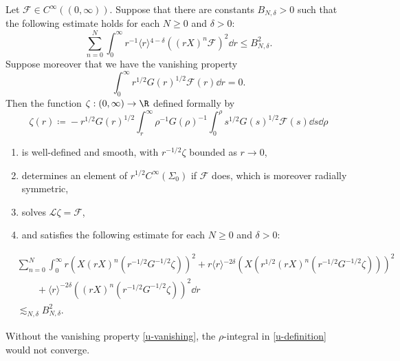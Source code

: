 \documentclass[10pt, reqno]{amsart}
\begin{document}
\begin{proposition}
Let \(\mathcal{F}\in C^\infty((0,\infty))\). Suppose that there are constants \(B_{N,\delta{}} >
0\) such that the following estimate holds for each \(N\ge 0\) and \(\delta{} > 0\):
\begin{equation}\label{F-estimate}
\sum_{n=0}^N\int_0^\infty r^{-1}\langle{}r\rangle{}^{4-\delta{}}((rX)^n\mathcal{F})^2\dd{}r\le  B_{N,\delta{}}^2.
\end{equation}
Suppose moreover that we have the vanishing property
\begin{equation}\label{u-vanishing}
\int_0^\infty r^{1/2}G(r)^{1/2}\mathcal{F}(r)\dd{}r = 0.
\end{equation}
Then the function \(\zeta{} : (0,\infty)\to \R\) defined formally by
\begin{equation}\label{u-definition}
\zeta{}(r)\coloneqq{}-r^{1/2}G(r)^{1/2}\int_r^\infty \rho{}^{-1}G(\rho{})^{-1}\int_0^\rho{} s^{1/2}G(s)^{1/2}\mathcal{F}(s)\dd{}s\dd{}\rho{}
\end{equation}
\begin{enumerate}
\item \label{u-well-defined} is well-defined and smooth, with \(r^{-1/2}\zeta{}\) bounded as \(r\to 0\),
\item \label{u-smooth} determines an element of \(r^{1/2}C^\infty(\Sigma{}_0)\) if \(\mathcal{F}\)
does, which is moreover radially symmetric,
\item \label{u-solution} solves \(\mathcal{L}\zeta{} = \mathcal{F}\),
\item \label{u-estimate} and satisfies the following estimate for each \(N\ge
   0\) and \(\delta{} > 0\):
\end{enumerate}
\begin{equation}
\begin{split}
&\sum_{n=0}^N\int_0^\infty r(X(rX)^n(r^{-1/2}G^{-1/2}\zeta{}))^2 + r\langle{}r\rangle{}^{-2\delta{}}(X(r^{1/2}(rX)^n(r^{-1/2}G^{-1/2}\zeta{})))^2 \\
&\qquad + \langle{}r\rangle^{-2\delta{}}((rX)^n(r^{-1/2}G^{-1/2}\zeta{}))^2 \dd{}r \\
&\lesssim_{N,\delta{}} B_{N,\delta{}}^2.
\end{split}
\end{equation}
\label{L-inverse-radially-symmetric}
\end{proposition}
\begin{remark}
Without the vanishing property \cref{u-vanishing}, the \(\rho{}\)-integral in
\cref{u-definition} would not converge.
\end{remark}
\end{document}
